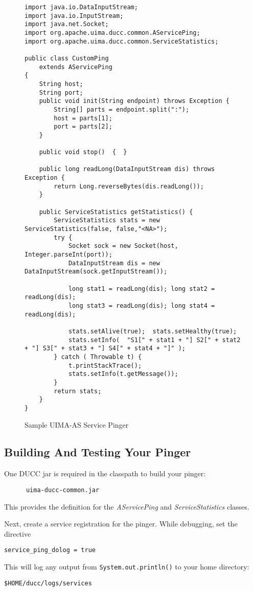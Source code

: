       \begin{figure}[H]
\begin{verbatim}
import java.io.DataInputStream;
import java.io.InputStream;
import java.net.Socket;
import org.apache.uima.ducc.common.AServicePing;
import org.apache.uima.ducc.common.ServiceStatistics;

public class CustomPing
    extends AServicePing
{
    String host;
    String port;
    public void init(String endpoint) throws Exception {
        String[] parts = endpoint.split(":");
        host = parts[1];
        port = parts[2];
    }

    public void stop()  {  }

    public long readLong(DataInputStream dis) throws Exception {
        return Long.reverseBytes(dis.readLong());
    }

    public ServiceStatistics getStatistics() {
        ServiceStatistics stats = new ServiceStatistics(false, false,"<NA>");
        try {
            Socket sock = new Socket(host, Integer.parseInt(port));
            DataInputStream dis = new DataInputStream(sock.getInputStream());

            long stat1 = readLong(dis); long stat2 = readLong(dis); 
            long stat3 = readLong(dis); long stat4 = readLong(dis);

            stats.setAlive(true);  stats.setHealthy(true);
            stats.setInfo(  "S1[" + stat1 + "] S2[" + stat2 + "] S3[" + stat3 + "] S4[" + stat4 + "]" );
        } catch ( Throwable t) {
        	t.printStackTrace();
            stats.setInfo(t.getMessage());
        }
        return stats;        
    }
}
\end{verbatim}
        \caption{Sample UIMA-AS Service Pinger}
        \label{fig:service.custom.pinger}

      \end{figure}
      
      \subsection{Building And Testing Your Pinger}
      
      One DUCC jar is required in the classpath to build your pinger:
\begin{verbatim}
      uima-ducc-common.jar
\end{verbatim}      
      This provides the definition for the {\em AServicePing} and {\em ServiceStatistics} classes.

      Next, create a service registration for the pinger.  While debugging, set the directive
\begin{verbatim}
service_ping_dolog = true
\end{verbatim}
      This will log any output from  {\tt System.out.println()} to your home directory:
\begin{verbatim}
$HOME/ducc/logs/services
\end{verbatim}

